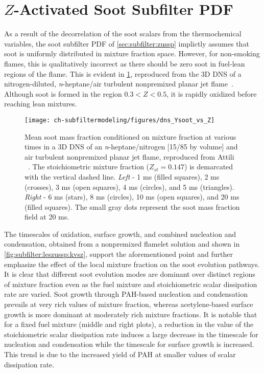 \section{\texorpdfstring{$Z$}{Z}-Activated Soot Subfilter PDF}
\label{sec:subfilter:zassp}

As a result of the decorrelation of the soot scalars from the thermochemical variables, the soot subfilter PDF of \cref{sec:subfilter:zussp} implictly assumes that soot is uniformly distributed in mixture fraction space. However, for non-smoking flames, this is qualitatively incorrect as there should be zero soot in fuel-lean regions of the flame. This is evident in \cref{fig:subfilter:leszussp:ysvsz}, reproduced from the 3D DNS of a nitrogen-diluted, \textit{n}-heptane/air turbulent nonpremixed planar jet flame~\cite{attili2014}. Although soot is formed in the region $0.3 < Z < 0.5$, it is rapidly oxidized before reaching lean mixtures.

\begin{figure}[htb]
  \centering
  \texttt{[image: ch-subfiltermodeling/figures/dns\_Ysoot\_vs\_Z]}
  \caption[DNS of Turbulent Nonpremixed / Jet Flame, \texorpdfstring{$\langle Y_{\text{s}}|Z \rangle$}{<Ys|Z>} vs. \texorpdfstring{$Z$}{Z}]{Mean soot mass fraction conditioned on mixture fraction at various times in a 3D DNS of an \textit{n}-heptane/nitrogen [15/85 by volume] and air turbulent nonpremixed planar jet flame, reproduced from Attili \etal~\cite{attili2014}. The stoichiometric mixture fraction ($Z_{st} = 0.147$) is demarcated with the vertical dashed line. \textit{Left} - 1 ms (filled squares), 2 ms (crosses), 3 ms (open squares), 4 ms (circles), and 5 ms (triangles). \textit{Right} - 6 ms (stars), 8 ms (circles), 10 ms (open squares), and 20 ms (filled squares). The small gray dots represent the soot mass fraction field at 20 ms.}
  \label{fig:subfilter:leszussp:ysvsz}
\end{figure}

The timescales of oxidation, surface growth, and combined nucleation and condensation, obtained from a nonpremixed flamelet solution and shown in \cref{fig:subfilter:leszussp:kvsz}, support the aforementioned point and further emphasize the effect of the local mixture fraction on the soot evolution pathways. It is clear that different soot evolution modes are dominant over distinct regions of mixture fraction even as the fuel mixture and stoichiometric scalar dissipation rate are varied. Soot growth through PAH-based nucleation and condensation prevails at very rich values of mixture fraction, whereas acetylene-based surface growth is more dominant at moderately rich mixture fractions. It is notable that for a fixed fuel mixture (middle and right plots), a reduction in the value of the stoichiometric scalar dissipation rate induces a large decrease in the timescale for nucleation and condensation while the timescale for surface growth is increased. This trend is due to the increased yield of PAH at smaller values of scalar dissipation rate.

